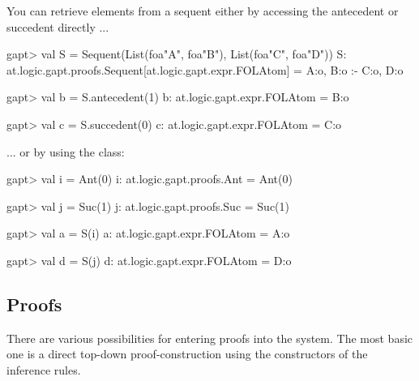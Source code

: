 \documentclass[a4paper,11pt]{article}
\newcommand{\cli}[1]{{\ttfamily {#1}}}
\begin{document}
You can retrieve elements from a sequent either by accessing the antecedent
or succedent directly ...
\begin{clilisting}
gapt> val S = Sequent(List(foa"A", foa"B"), List(foa"C", foa"D"))
S: at.logic.gapt.proofs.Sequent[at.logic.gapt.expr.FOLAtom] = A:o, B:o :- C:o, D:o

gapt> val b = S.antecedent(1)
b: at.logic.gapt.expr.FOLAtom = B:o

gapt> val c = S.succedent(0)
c: at.logic.gapt.expr.FOLAtom = C:o

\end{clilisting}
... or by using the \cli{SequentIndex} class:

\begin{clilisting}
gapt> val i = Ant(0)
i: at.logic.gapt.proofs.Ant = Ant(0)

gapt> val j = Suc(1)
j: at.logic.gapt.proofs.Suc = Suc(1)

gapt> val a = S(i)
a: at.logic.gapt.expr.FOLAtom = A:o

gapt> val d = S(j)
d: at.logic.gapt.expr.FOLAtom = D:o

\end{clilisting}


\subsection{Proofs}\label{sec:entering_proofs}

There are various possibilities for entering proofs into the system. The most
basic one is a direct top-down proof-construction using the constructors
of the inference rules.
\end{document}
